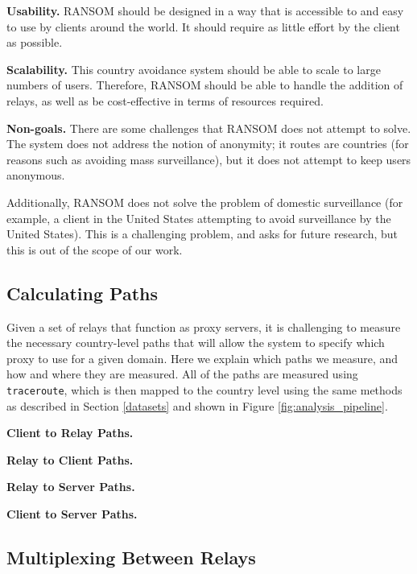 {\bf Usability.} RANSOM should be designed in a way that is accessible to and 
easy to use by clients around the world.  It should require as little effort by 
the client as possible.

{\bf Scalability.}  This country avoidance system should be able to scale to 
large numbers of users.  Therefore, RANSOM should be able to handle the addition
 of relays, as well as be cost-effective in terms of resources required.

{\bf Non-goals.}  There are some challenges that RANSOM does not attempt to 
solve.  The system does not address the notion of anonymity; it routes are 
countries (for reasons such as avoiding mass surveillance), but it does not 
attempt to keep users anonymous.  

Additionally, RANSOM does not solve the problem of domestic surveillance (for 
example, a client in the United States attempting to avoid surveillance by the 
United States).  This is a challenging problem, and asks for future research, 
but this is out of the scope of our work.

\subsection{Calculating Paths}
Given a set of relays that function as proxy servers, it is challenging to 
measure the necessary country-level paths that will allow the system to specify 
which proxy to use for a given domain.  Here we explain which paths we measure, 
and how and where they are measured.  All of the paths are measured using {\tt 
traceroute}, which is then mapped to the country level using the same methods as 
described in Section \ref{datasets} and shown in Figure 
\ref{fig:analysis_pipeline}.

{\bf Client to Relay Paths.}

{\bf Relay to Client Paths.}

{\bf Relay to Server Paths.}

{\bf Client to Server Paths.}


\subsection{Multiplexing Between Relays}

